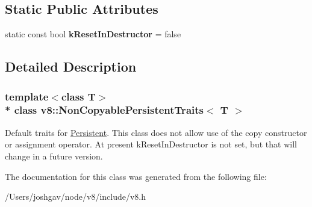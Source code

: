 \subsection*{Static Public Attributes}
\begin{DoxyCompactItemize}
\item 
static const bool {\bfseries k\+Reset\+In\+Destructor} = false\hypertarget{classv8_1_1_non_copyable_persistent_traits_a650880d85ff80634c30a195d20329681}{}\label{classv8_1_1_non_copyable_persistent_traits_a650880d85ff80634c30a195d20329681}

\end{DoxyCompactItemize}


\subsection{Detailed Description}
\subsubsection*{template$<$class T$>$\\*
class v8\+::\+Non\+Copyable\+Persistent\+Traits$<$ T $>$}

Default traits for \hyperlink{classv8_1_1_persistent}{Persistent}. This class does not allow use of the copy constructor or assignment operator. At present k\+Reset\+In\+Destructor is not set, but that will change in a future version. 

The documentation for this class was generated from the following file\+:\begin{DoxyCompactItemize}
\item 
/\+Users/joshgav/node/v8/include/v8.\+h\end{DoxyCompactItemize}
